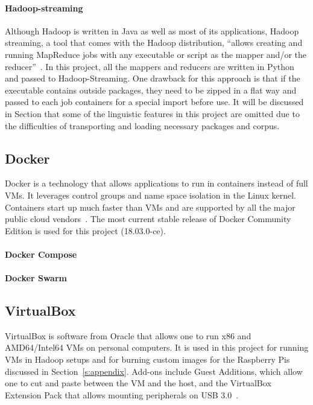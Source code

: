 \paragraph{Hadoop-streaming} Although Hadoop is written in Java as well 
as most of its applications, Hadoop streaming, a tool that comes with the 
Hadoop distribution, ``allows creating and running MapReduce jobs with any 
executable or script as the mapper and/or the 
reducer''~\cite{hid-sp18-405-hadoop-streaming}. In this project, all the 
mappers and reducers are written in Python and passed to 
Hadoop-Streaming. One drawback for this approach is that if the executable 
contains outside packages, they need to be zipped in a flat way and passed 
to each job containers for a special import before use. 
It will be discussed in Section\label{s:algorithm} that some of the linguistic 
features in this project are omitted due to the difficulties of transporting and 
loading necessary packages and corpus. 


\subsection{Docker}
Docker is a technology that allows applications to run in containers
instead of full VMs. It leverages control groups and name space
isolation in the Linux kernel. Containers start up much faster than
VMs and are supported by all the major public cloud
vendors~\cite{Foster:2017:CCS:3158276}. The most current stable
release of Docker Community Edition is used for this project
(18.03.0-ce).
\paragraph{Docker Compose}
\paragraph{Docker Swarm}

\subsection{VirtualBox}
VirtualBox is software from Oracle that allows one to run x86 and
AMD64/Intel64 VMs on personal computers. It is used in this project
for running VMs in Hadoop setups and for burning custom images for the
Raspberry Pis discussed in Section~\ref{s:appendix}. Add-ons include
Guest Additions, which allow one to cut and paste between the VM and
the host, and the VirtualBox Extension Pack that allows mounting
peripherals on USB 3.0~\cite{hid-sp18-419-virtualbox}.

